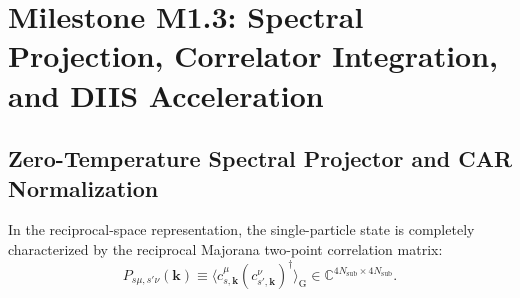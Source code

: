 \chapter{Milestone M1.3: Spectral Projection, Correlator Integration, and DIIS Acceleration}
\label{ch:m1_3}

\section{Zero-Temperature Spectral Projector and CAR Normalization}
\label{sec:m1_3_spectral_projector}
In the reciprocal-space representation, the single-particle state is completely characterized by the reciprocal Majorana two-point correlation matrix:
\begin{equation}
\label{eq:m1_3_P_def}
P_{s\mu, s'\nu}(\mathbf{k}) \equiv \langle c_{s, \mathbf{k}}^\mu (c_{s', \mathbf{k}}^\nu)^\dagger \rangle_{\mathrm{G}} \in \mathbb{C}^{4N_{\mathrm{sub}} \times 4N_{\mathrm{sub}}}.
\end{equation}

